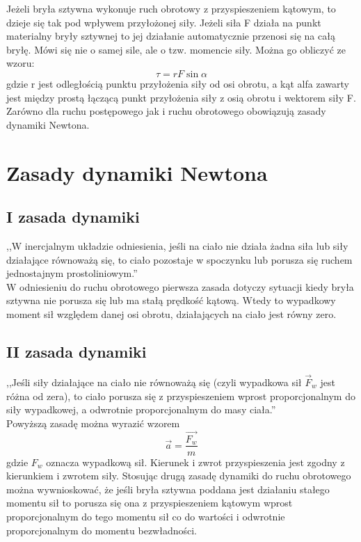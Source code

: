 Jeżeli bryła sztywna wykonuje ruch obrotowy z przyspieszeniem kątowym, to dzieje się tak pod wpływem przyłożonej siły. Jeżeli siła F działa na punkt materialny bryły sztywnej to jej działanie automatycznie przenosi się na całą bryłę. Mówi się nie o samej sile, ale o tzw. momencie siły. Można go obliczyć ze wzoru:
\begin{equation}\tau=rF\sin\alpha\end{equation}
gdzie r jest odległością punktu przyłożenia siły od osi obrotu, a kąt alfa zawarty jest między prostą łączącą punkt przyłożenia siły z osią obrotu i wektorem siły F.\\
Zarówno dla ruchu postępowego jak i ruchu obrotowego obowiązują zasady dynamiki Newtona.
\section{Zasady dynamiki Newtona}
\subsection{I zasada dynamiki}
,,W inercjalnym układzie odniesienia, jeśli na ciało nie działa żadna siła lub siły działające równoważą się, to ciało pozostaje w spoczynku lub porusza się ruchem jednostajnym prostoliniowym.''\cite{wiki3}\\ 
W odniesieniu do ruchu obrotowego pierwsza zasada dotyczy sytuacji kiedy bryła sztywna nie porusza się lub ma stałą prędkość kątową. Wtedy to wypadkowy moment sił względem danej osi obrotu, działających na ciało jest równy zero.
\subsection{II zasada dynamiki}
,,Jeśli siły działające na ciało nie równoważą się (czyli wypadkowa sił $\vec{F}_{w}$ jest różna od zera), to ciało porusza się z przyspieszeniem wprost proporcjonalnym do siły wypadkowej, a odwrotnie proporcjonalnym do masy ciała.''\cite{wiki3}\\
Powyższą zasadę można wyrazić wzorem
\begin{equation}\vec{a}=\frac{\vec{F_w}}{m}\end{equation}
gdzie $F_w$ oznacza wypadkową sił. Kierunek i zwrot przyspieszenia jest zgodny z kierunkiem i zwrotem siły. 
Stosując drugą zasadę dynamiki do ruchu obrotowego można wywnioskować, że jeśli bryła sztywna poddana jest działaniu stałego momentu sił to porusza się ona z przyspieszeniem kątowym wprost proporcjonalnym do tego momentu sił co do wartości i odwrotnie proporcjonalnym do momentu bezwładności.

